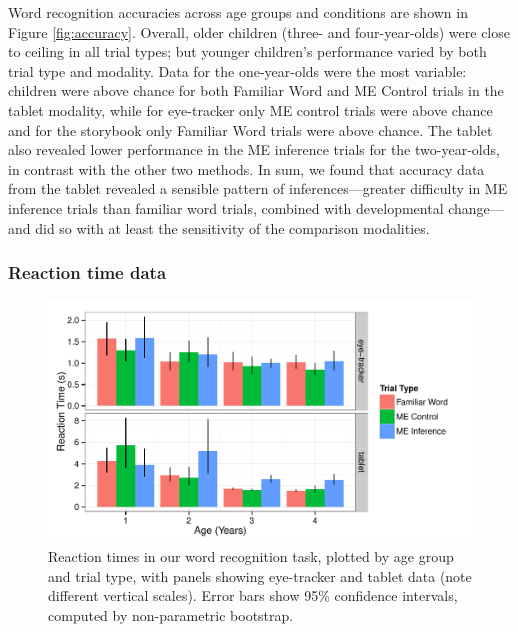 \documentclass[man,noapacite]{apa2}
\begin{document}
Word recognition accuracies across age groups and conditions are shown in Figure \ref{fig:accuracy}. Overall, older children (three- and four-year-olds) were close to ceiling in all trial types; but younger children's performance varied by both trial type and modality. Data for the one-year-olds were the most variable: children were above chance for both Familiar Word and ME Control trials in the tablet modality, while for eye-tracker only ME control trials were above chance and for the storybook only Familiar Word trials were above chance. The tablet also revealed lower performance in the ME inference trials for the two-year-olds, in contrast with the other two methods. In sum, we found that accuracy data from the tablet revealed a sensible pattern of inferences---greater difficulty in ME inference trials than familiar word trials, combined with developmental change---and did so with at least the sensitivity of the comparison modalities. 

\subsubsection{Reaction time data}

\begin{figure}[t] 
  \begin{center} 
    \includegraphics[width=5in]{figures/rt.pdf} 
    \caption{\label{fig:rt} Reaction times in our word recognition task, plotted by age group and trial type, with panels showing eye-tracker and tablet data (note different vertical scales). Error bars show 95\% confidence intervals, computed by non-parametric bootstrap.}
  \end{center} 
\end{figure}
\end{document}

